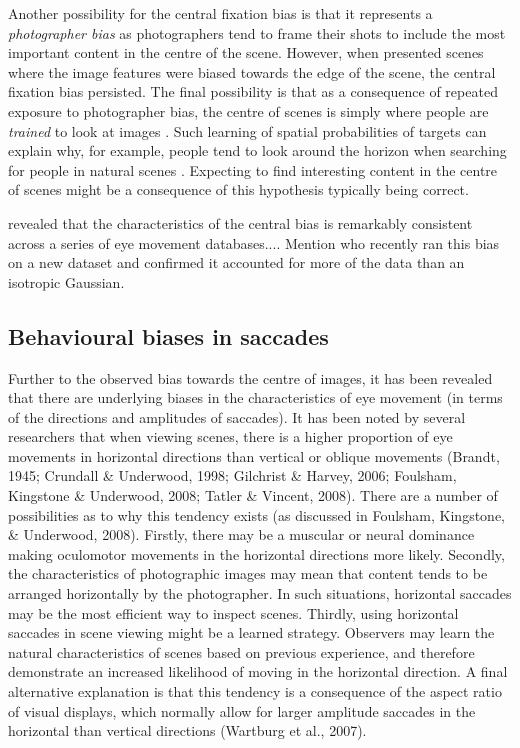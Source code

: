 \documentclass[a4paper, twocolumn, oneside, 10pt]{article}
\begin{document}
Another possibility for the central fixation bias is that it represents a \emph{photographer bias} as photographers tend to frame their shots to include the most important content in the centre of the scene. However, when \cite{Tatler:2007hk} presented scenes where the image features were biased towards the edge of the scene, the central fixation bias persisted. The final possibility is that as a consequence of repeated exposure to photographer bias, the centre of scenes is simply where people are \emph{trained} to look at images \citep{Parkhurst:2002vo}. Such learning of spatial probabilities of targets can explain why, for example, people tend to look around the horizon when searching for people in natural scenes \citep{Birmingham:2009hl, Torralba:2006iq, Ehinger:2009ji}. Expecting to find interesting content in the centre of scenes might be a consequence of this hypothesis typically being correct.

\cite{clarke-tatler2014} revealed that the characteristics of the central bias is remarkably consistent across a series of eye movement databases.... Mention \cite{nuthmann2015} who recently ran this bias on a new dataset and confirmed it accounted for more of the data than an isotropic Gaussian.

\subsection{Behavioural biases in saccades}
Further to the observed bias towards the centre of images, it has been revealed that there are underlying biases in the characteristics of eye movement (in terms of the directions and amplitudes of saccades). It has been noted by several researchers that when viewing scenes, there is a higher proportion of eye movements in horizontal directions than vertical or oblique movements (Brandt, 1945; Crundall \& Underwood, 1998; Gilchrist \& Harvey, 2006; Foulsham, Kingstone \& Underwood, 2008; Tatler \& Vincent, 2008). There are a number of possibilities as to why this tendency exists (as discussed in Foulsham, Kingstone, \& Underwood, 2008). Firstly, there may be a muscular or neural dominance making oculomotor movements in the horizontal directions more likely. Secondly, the characteristics of photographic images may mean that content tends to be arranged horizontally by the photographer. In such situations, horizontal saccades may be the most efficient way to inspect scenes. Thirdly, using horizontal saccades in scene viewing might be a learned strategy. Observers may learn the natural characteristics of scenes based on previous experience, and therefore demonstrate an increased likelihood of moving in the horizontal direction. A final alternative explanation is that this tendency is a consequence of the aspect ratio of visual displays, which normally allow for larger amplitude saccades in the horizontal than vertical directions (Wartburg et al., 2007).
\end{document}
